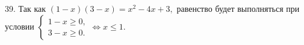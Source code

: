 39. Так как $(1-x)(3-x)=x^2-4x+3,$ равенство будет выполняться при условии $\begin{cases}1-x\geqslant0,\\ 3-x\geqslant0.\end{cases}\Leftrightarrow x\leqslant1.$\\
